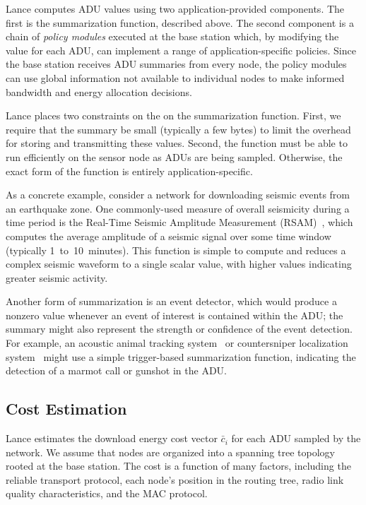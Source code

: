 Lance computes ADU values using two application-provided components. The
first is the summarization function, described above. The second component is
a chain of \textit{policy modules} executed at the base station which, by
modifying the value for each ADU, can implement a range of
application-specific policies. Since the base station receives ADU summaries
from every node, the policy modules can use global information not available
to individual nodes to make informed bandwidth and energy allocation
decisions.

Lance places two constraints on the on the summarization function. First, we
require that the summary be small (typically a few bytes) to limit the
overhead for storing and transmitting these values. Second, the function must
be able to run efficiently on the sensor node as ADUs are being sampled.
Otherwise, the exact form of the function is entirely application-specific.

As a concrete example, consider a network for downloading seismic events from
an earthquake zone. One commonly-used measure of overall seismicity during a
time period is the Real-Time Seismic Amplitude Measurement
(RSAM)~\cite{rsam}, which computes the average amplitude of a seismic signal
over some time window (typically 1~to~10~minutes). This function is simple
to compute and reduces a complex seismic waveform to a single scalar value,
with higher values indicating greater seismic activity.

Another form of summarization is an event detector, which would produce a
nonzero value whenever an event of interest is contained within the ADU; the
summary might also represent the strength or confidence of the event
detection. For example, an acoustic animal tracking
system~\cite{girod-ipsn07} or countersniper localization
system~\cite{shooter-localization} might use a simple trigger-based
summarization function, indicating the detection of a marmot call or gunshot
in the ADU.

\subsection{Cost Estimation}
\label{lance-subsec-costestimation}

Lance estimates the download energy cost vector $\bar{c}_i$ for each ADU
sampled by the network. We assume that nodes are organized into a spanning
tree topology rooted at the base station. The cost is a function of many
factors, including the reliable transport protocol, each node's position in
the routing tree, radio link quality characteristics, and the MAC protocol. 

